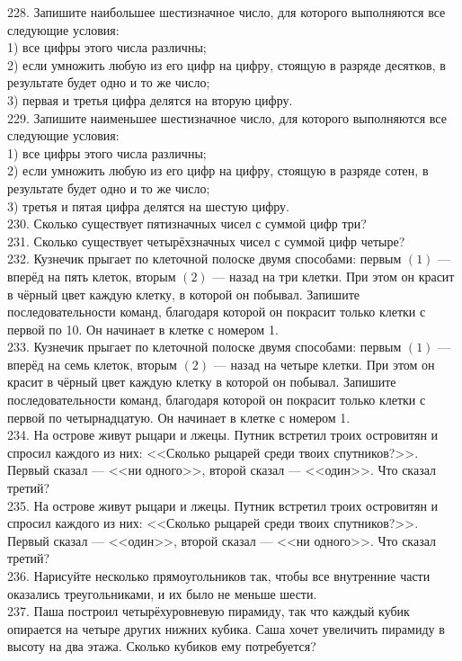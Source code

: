 \documentclass[12pt]{article}
\begin{document}
228. Запишите наибольшее шестизначное число, для которого выполняются все следующие условия:\\
1) все цифры этого числа различны;\\
2) если умножить любую из его цифр на цифру, стоящую в разряде десятков, в результате будет одно и то же число;\\
3) первая и третья цифра делятся на вторую цифру.\\
229. Запишите наименьшее шестизначное число, для которого выполняются все следующие условия:\\
1) все цифры этого числа различны;\\
2) если умножить любую из его цифр на цифру, стоящую в разряде сотен, в результате будет одно и то же число;\\
3) третья и пятая цифра делятся на шестую цифру.\\
230. Сколько существует пятизначных чисел с суммой цифр три?\\
231. Сколько существует четырёхзначных чисел с суммой цифр четыре?\\
232. Кузнечик прыгает по клеточной полоске двумя способами: первым $(1)$ --- вперёд на пять клеток, вторым $(2)$ --- назад на три клетки. При этом он красит в чёрный цвет каждую клетку,  в которой он побывал. Запишите последовательности команд, благодаря которой он покрасит только клетки с первой по 10. Он начинает в клетке с номером 1.\\
233. Кузнечик прыгает по клеточной полоске двумя способами: первым $(1)$ --- вперёд на семь клеток, вторым $(2)$ --- назад на четыре клетки. При этом он красит в чёрный цвет каждую клетку в которой он побывал. Запишите последовательности команд, благодаря которой он покрасит только клетки с первой по четырнадцатую. Он начинает в клетке с номером 1.\\
234. На острове живут рыцари и лжецы. Путник встретил троих островитян и спросил каждого из них: <<Сколько рыцарей среди твоих спутников?>>. Первый сказал --- <<ни одного>>,  второй сказал --- <<один>>. Что сказал третий?\\
235. На острове живут рыцари и лжецы. Путник встретил троих островитян и спросил каждого из них: <<Сколько рыцарей среди твоих спутников?>>. Первый сказал --- <<один>>,  второй сказал --- <<ни одного>>. Что сказал третий?\\
236. Нарисуйте несколько прямоугольников так, чтобы все внутренние части оказались треугольниками, и их было не меньше шести.\\
237. Паша построил четырёхуровневую пирамиду, так что каждый кубик опирается на четыре других нижних кубика. Саша хочет увеличить пирамиду в высоту на два этажа. Сколько кубиков ему потребуется?\\
\end{document}
